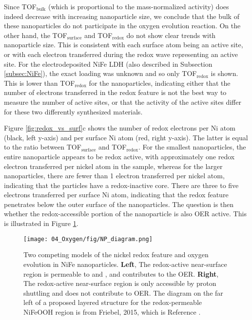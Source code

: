 Since TOF$_{\text{bulk}}$ (which is proportional to the mass-normalized activity) does indeed decrease with increasing nanoparticle size, we conclude that the bulk of these nanoparticles do not participate in the oxygen evolution reaction. On the other hand, the TOF$_{\text{surface}}$ and TOF$_{\text{redox}}$ do not show clear trends with nanoparticle size. This is consistent with each surface atom being an active site, or with each electron transferred during the redox wave representing an active site. For the electrodeposited NiFe LDH (also described in Subsection \ref{subsec:NiFe}), the exact loading was unknown and so only TOF$_{\text{redox}}$ is shown. This is lower than TOF$_{\text{redox}}$ for the nanoparticles, indicating either that the number of electrons transferred in the redox feature is not the best way to measure the number of active sites, or that the activity of the active sites differ for these two differently synthesized materials.

Figure \ref{fig:redox_vs_surf}c shows the number of redox electrons per Ni atom (black, left y-axis) and per surface Ni atom (red, right y-axis). The latter is equal to the ratio between TOF$_{\text{surface}}$ and TOF$_{\text{redox}}$. For the smallest nanoparticles, the entire nanoparticle appears to be redox active, with approximately one redox electron transferred per nickel atom in the sample, whereas for the larger nanoparticles, there are fewer than 1 electron transferred per nickel atom, indicating that the particles have a redox-inactive core. There are three to five electrons transferred per surface Ni atom, indicating that the redox feature penetrates below the outer surface of the nanoparticles. The question is then whether the redox-accessible portion of the nanoparticle is also OER active. This is illustrated in Figure \ref{fig:NP_diagram}.

\begin{figure}[h!]
	\centering
	\texttt{[image: 04\_Oxygen/fig/NP\_diagram.png]}
	\caption{Two competing models of the nickel redox feature and oxygen evolution in NiFe nanoparticles. \textbf{Left}, The redox-active near-surface region is permeable to  and , and contributes to the OER. \textbf{Right}, The redox-active near-surface region is only accessible by proton shuttling and does not contribute to OER. The diagram on the far left of a proposed layered structure for the redox-permeable NiFeOOH region is from Friebel, 2015, which is Reference \cite{Friebel2015}.}
	\label{fig:NP_diagram}
\end{figure}

